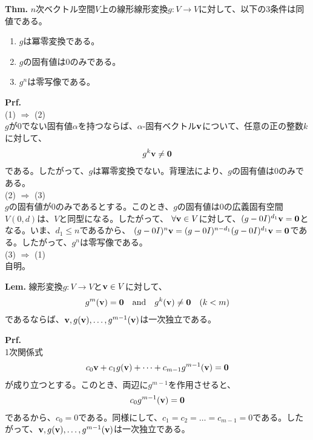 \documentclass[a4paper,11pt]{jsarticle}
\numberwithin{equation}{section}
\begin{document}
\begin{itembox}[l]{\textbf{Thm.}}
  $n$次ベクトル空間$V$上の線形線形変換$g: V \to V$に対して、以下の3条件は同値である。
  \begin{enumerate}
    \item $g$は冪零変換である。
    \item $g$の固有値は$0$のみである。
    \item $g^n$は零写像である。
  \end{enumerate}
\end{itembox}
\textbf{Prf.}\\
(1) $\Rightarrow$ (2)\\
$g$が0でない固有値$\alpha$を持つならば、$\alpha$-固有ベクトル$\vb{v}$について、任意の正の整数$k$に対して、
\begin{align}
  g^k\vb{v} \neq \vb{0}
\end{align}
である。したがって、$g$は冪零変換でない。背理法により、$g$の固有値は$0$のみである。\\
(2) $\Rightarrow$ (3)\\
$g$の固有値が$0$のみであるとする。このとき、$g$の固有値は$0$の広義固有空間$V(0,d)$は、$V$と同型になる。したがって、
$\forall \vb{v} \in V$に対して、$(g-0I)^{d_1}\vb{v} = \vb{0}$となる。いま、$d_1 \leq n$であるから、
$(g-0I)^{n}\vb{v} = (g-0I)^{n-d_1}(g-0I)^{d_1}\vb{v} = \vb{0}$である。したがって、$g^n$は零写像である。\\
(3) $\Rightarrow$ (1)\\
自明。\hfill\qedsymbol\\

\begin{itembox}[l]{\textbf{Lem.}}
  線形変換$g: V \to V$と$\vb{v} \in V$に対して、
  \begin{align}
    g^m(\vb{v}) = \vb{0} \quad \text{and} \quad g^{k}(\vb{v}) \neq \vb{0} \quad (k < m)
  \end{align}
  であるならば、$\vb{v}, g(\vb{v)}, \dots, g^{m-1}(\vb{v})$は一次独立である。
\end{itembox}
\textbf{Prf.}\\
1次関係式
\begin{align}
  c_0\vb{v} + c_1g(\vb{v}) + \dots + c_{m-1}g^{m-1}(\vb{v}) = \vb{0}
\end{align}
が成り立つとする。このとき、両辺に$g^{m-1}$を作用させると、
\begin{align}
  c_0g^{m-1}(\vb{v}) = \vb{0}
\end{align}
であるから、$c_0 = 0$である。同様にして、$c_1 = c_2 = \dots = c_{m-1} = 0$である。したがって、$\vb{v}, g(\vb{v}), \dots, g^{m-1}(\vb{v})$は一次独立である。\hfill\qedsymbol\\
\end{document}
